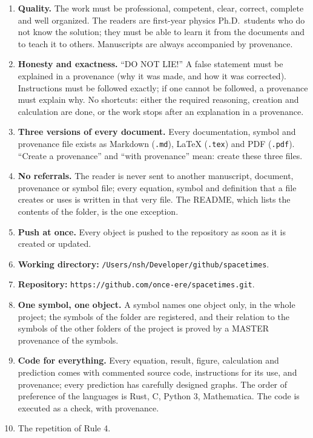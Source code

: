 \documentclass[
  10pt,
]{article}
\providecommand{\tightlist}{%
  \setlength{\itemsep}{0pt}\setlength{\parskip}{0pt}}
\begin{document}
\begin{enumerate}
\def\labelenumi{\arabic{enumi}.}
\tightlist
\item
  \textbf{Quality.} The work must be professional, competent, clear,
  correct, complete and well organized. The readers are first-year
  physics Ph.D.~students who do not know the solution; they must be able
  to learn it from the documents and to teach it to others. Manuscripts
  are always accompanied by provenance.
\item
  \textbf{Honesty and exactness.} ``DO NOT LIE!'' A false statement must
  be explained in a provenance (why it was made, and how it was
  corrected). Instructions must be followed exactly; if one cannot be
  followed, a provenance must explain why. No shortcuts: either the
  required reasoning, creation and calculation are done, or the work
  stops after an explanation in a provenance.
\item
  \textbf{Three versions of every document.} Every documentation, symbol
  and provenance file exists as Markdown (\texttt{.md}), LaTeX
  (\texttt{.tex}) and PDF (\texttt{.pdf}). ``Create a provenance'' and
  ``with provenance'' mean: create these three files.
\item
  \textbf{No referrals.} The reader is never sent to another manuscript,
  document, provenance or symbol file; every equation, symbol and
  definition that a file creates or uses is written in that very file.
  The README, which lists the contents of the folder, is the one
  exception.
\item
  \textbf{Push at once.} Every object is pushed to the repository as
  soon as it is created or updated.
\item
  \textbf{Working directory:}
  \texttt{/Users/nsh/Developer/github/spacetimes}.
\item
  \textbf{Repository:}
  \texttt{https://github.com/once-ere/spacetimes.git}.
\item
  \textbf{One symbol, one object.} A symbol names one object only, in
  the whole project; the symbols of the folder are registered, and their
  relation to the symbols of the other folders of the project is proved
  by a MASTER provenance of the symbols.
\item
  \textbf{Code for everything.} Every equation, result, figure,
  calculation and prediction comes with commented source code,
  instructions for its use, and provenance; every prediction has
  carefully designed graphs. The order of preference of the languages is
  Rust, C, Python 3, Mathematica. The code is executed as a check, with
  provenance.
\item
  The repetition of Rule 4.
\end{enumerate}
\end{document}
